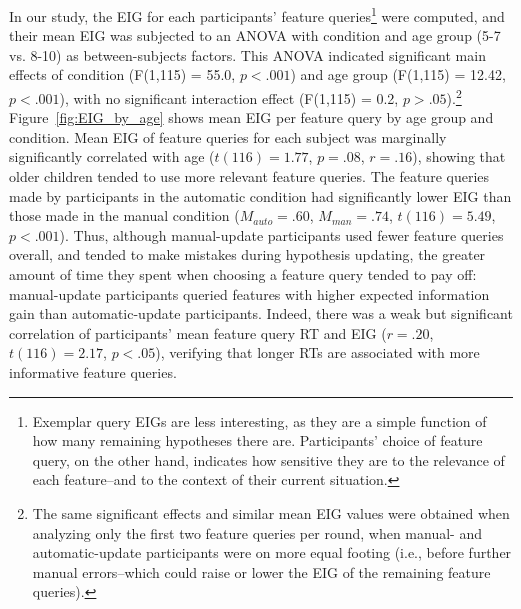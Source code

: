 \documentclass[man,floatsintext]{apa6}
\begin{document}
In our study, the EIG for each participants' feature queries\footnote{Exemplar query EIGs are 
less interesting, as they are a simple function of how many remaining hypotheses 
there are. Participants' choice of feature query, on the other hand, indicates how 
sensitive they are to the relevance of each feature--and to the context of their 
current situation.} were computed, and their mean EIG was 
subjected to an ANOVA with condition and age group (5-7 vs. 8-10) as between-subjects factors. 
This ANOVA indicated significant main effects of condition (F(1,115) = 55.0, $p<.001$) 
and age group (F(1,115) = 12.42, $p<.001$), with no significant interaction effect (F(1,115) = 0.2, $p>.05$).\footnote{The same significant effects and similar mean EIG values were obtained when analyzing only the first two feature queries per round, when manual- and automatic-update participants were on more equal footing (i.e., before further manual errors--which could raise or lower the EIG of the remaining feature queries).}
Figure~\ref{fig:EIG_by_age} shows mean EIG per feature query by age group and condition. Mean 
EIG of feature queries for each subject was marginally significantly correlated with 
age ($t(116)=1.77$, $p=.08$, $r=.16$), showing that older children tended to use 
more relevant feature queries. The feature queries made by participants in the 
automatic condition had significantly lower EIG than those made in the manual 
condition ($M_{auto} = .60$, $M_{man} = .74$, $t(116) = 5.49$,  $p<.001$). Thus, 
although manual-update participants used fewer feature queries overall, and tended 
to make mistakes during hypothesis updating, the greater amount of time they spent 
when choosing a feature query tended to pay off: manual-update participants 
queried features with higher expected information gain than automatic-update 
participants. Indeed, there was a weak but significant correlation of participants' mean feature query RT and EIG ($r=.20$, $t(116)=2.17$, $p<.05$), verifying that longer RTs are associated with more informative feature queries.
\end{document}
